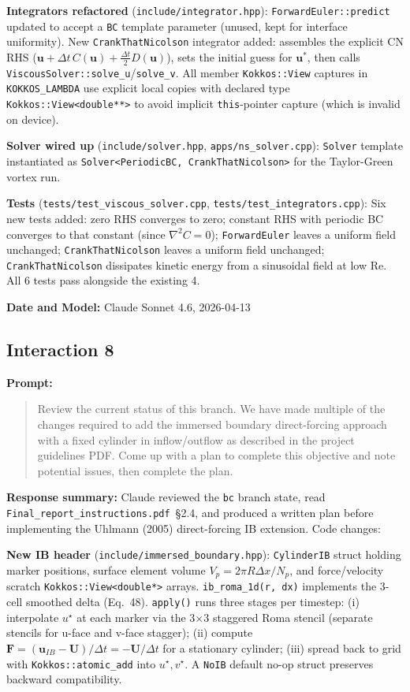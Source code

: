 \textbf{Integrators refactored} (\texttt{include/integrator.hpp}):
\texttt{ForwardEuler::predict} updated to accept a \texttt{BC} template parameter (unused, kept for interface uniformity). New \texttt{CrankThatNicolson} integrator added: assembles the explicit CN RHS ($\mathbf{u} + \Delta t\,C(\mathbf{u}) + \frac{\Delta t}{2}D(\mathbf{u})$), sets the initial guess for $\mathbf{u}^*$, then calls \texttt{ViscousSolver::solve\_u}/\texttt{solve\_v}. All member \texttt{Kokkos::View} captures in \texttt{KOKKOS\_LAMBDA} use explicit local copies with declared type \texttt{Kokkos::View<double**>} to avoid implicit \texttt{this}-pointer capture (which is invalid on device).

\textbf{Solver wired up} (\texttt{include/solver.hpp}, \texttt{apps/ns\_solver.cpp}):
\texttt{Solver} template instantiated as \texttt{Solver<PeriodicBC, CrankThatNicolson>} for the Taylor-Green vortex run.

\textbf{Tests} (\texttt{tests/test\_viscous\_solver.cpp}, \texttt{tests/test\_integrators.cpp}):
Six new tests added: zero RHS converges to zero; constant RHS with periodic BC converges to that constant (since $\nabla^2 C = 0$); \texttt{ForwardEuler} leaves a uniform field unchanged; \texttt{CrankThatNicolson} leaves a uniform field unchanged; \texttt{CrankThatNicolson} dissipates kinetic energy from a sinusoidal field at low Re. All 6 tests pass alongside the existing 4.

\textbf{Date and Model:} Claude Sonnet 4.6, 2026-04-13

\subsection*{Interaction 8}

\textbf{Prompt:}
\begin{quote}
Review the current status of this branch. We have made multiple of the changes required to add the immersed boundary direct-forcing approach with a fixed cylinder in inflow/outflow as described in the project guidelines PDF. Come up with a plan to complete this objective and note potential issues, then complete the plan.
\end{quote}

\textbf{Response summary:}
Claude reviewed the \texttt{bc} branch state, read \texttt{Final\_report\_instructions.pdf}~\S2.4, and produced a written plan before implementing the Uhlmann (2005) direct-forcing IB extension. Code changes:

\textbf{New IB header} (\texttt{include/immersed\_boundary.hpp}): \texttt{CylinderIB} struct holding marker positions, surface element volume $V_p = 2\pi R \Delta x / N_p$, and force/velocity scratch \texttt{Kokkos::View<double*>} arrays. \texttt{ib\_roma\_1d(r, dx)} implements the 3-cell smoothed delta (Eq.~48). \texttt{apply()} runs three stages per timestep: (i) interpolate $u^\star$ at each marker via the 3$\times$3 staggered Roma stencil (separate stencils for u-face and v-face stagger); (ii) compute $\mathbf{F}=(\mathbf{u}_{IB}-\mathbf{U})/\Delta t=-\mathbf{U}/\Delta t$ for a stationary cylinder; (iii) spread back to grid with \texttt{Kokkos::atomic\_add} into $u^\star,v^\star$. A \texttt{NoIB} default no-op struct preserves backward compatibility.

